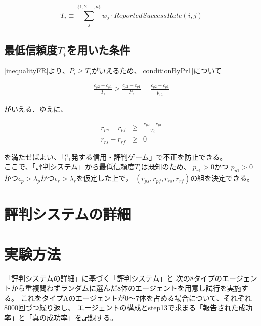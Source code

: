 \begin{equation}
  T_i \equiv \sum^{\{1,2,..., n\}}_{j} w_j \cdot ReportedSuccessRate(i, j) \label{conditionT_i}
\end{equation}

\subsection{最低信頼度$T_i$を用いた条件}
\label{conditionByTrustScore}
\eqref{inequalityFR}より、$ P_i \geq T_i $がいえるため、\eqref{conditionByPr1}について

\begin{eqnarray}
  \frac{c_{p2} - c_{p1}}{T_i} \geq \frac{c_{p2} - c_{p1}}{P_i} = \frac{c_{p2} - c_{p1}}{p_{r1}} \nonumber
\end{eqnarray}

がいえる．ゆえに、

\begin{eqnarray}
  r_{ps} - r_{pf} &\geq& \frac{c_{p2} - c_{p1}}{T_i} \label{condition6-1} \\
  r_{rs} - r_{rf} &\geq& 0 \label{condition6-2}
\end{eqnarray}

を満たせばよい、「告発する信用・評判ゲーム」で不正を防止できる。\\

ここで、「評判システム」から最低信頼度$T_i$は既知のため、
$p_{r1} > 0$かつ $p_{p1} > 0$かつ$ \epsilon_p > \lambda_p $かつ$ \epsilon_r > \lambda_r $を仮定した上で，
$ (r_{ps}, r_{pf}, r_{rs}, r_{rf}) $の組を決定できる。

\section{評判システムの詳細}


\section{実験方法}
「評判システムの詳細」に基づく「評判システム」と
次の8タイプのエージェントから重複問わずランダムに選んだ8体のエージェントを用意し試行を実施する。
これをタイプAのエージェントが0〜7体を占める場合について、それぞれ8000回づつ繰り返し、
エージェントの構成とstep13で求まる「報告された成功率」と「真の成功率」を記録する。

